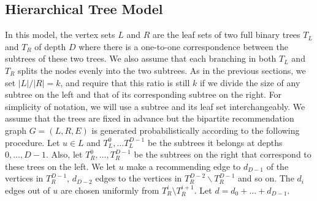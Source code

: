 \subsection{Hierarchical Tree Model}
\label{hierarchy}

In this model, the vertex sets $L$
and $R$ are the leaf sets of two full binary trees $T_L$ and $T_R$ of
depth $D$ where there is a one-to-one correspondence between the
subtrees of these two trees. We also assume that each branching in
both $T_L$ and $T_R$ splits the nodes evenly into the two
subtrees. As in the previous sections, we set $|L|/|R|=k$,
and require that this ratio is still $k$ if we divide the size of any subtree on the left
and that of its corresponding subtree on the right. For simplicity of notation, we
will use a subtree and its leaf set interchangeably. We assume that the trees are
fixed in advance but the bipartite recommendation graph $G = (L, R, E)$ is generated probabilistically according to
the following procedure. Let $u\in L$ and $T_L^0, \ldots T^{D-1}_L$ be
the subtrees it belongs at depths $0,\ldots, D-1$. Also, let
$T_R^0,\ldots, T_R^{D-1}$ be the subtrees on the right that correspond
to these trees on the left. We let $u$ make a recommending edge to $d_{D-1}$ of
the vertices in $T_{R}^{D-1}$, $d_{D-2}$ edges to the vertices in
$T_{R}^{D-2} \backslash T_{R}^{D-1}$ and so on. The $d_i$ edges out of $u$ are chosen uniformly from $T_R^i \setminus T_R^{i+1}$.
Let $d = d_{0} + \ldots + d_{D-1}$.\vs

